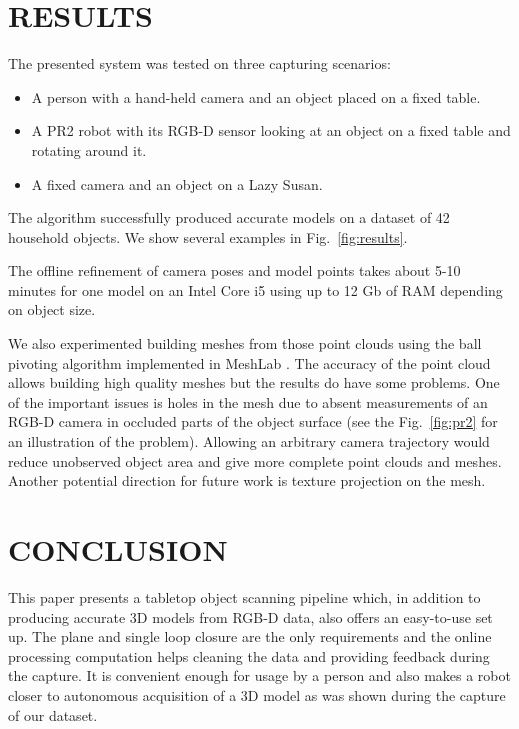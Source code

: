 \documentclass[letterpaper, 10 pt, conference]{ieeeconf}  %
\begin{document}
\section{RESULTS}

\label{sec:experiments}

The presented system was tested on three capturing scenarios:

\begin{itemize}
 \item A person with a hand-held camera and an object placed on a fixed table.
 \item A PR2 robot with its RGB-D sensor looking at an object on a fixed table and rotating around it.
 \item A fixed camera and an object on a Lazy Susan.
\end{itemize}

The algorithm successfully produced accurate models 
on a dataset of 42 household objects. We show several examples in Fig.~\ref{fig:results}.

The offline refinement of camera poses 
and model points takes about 5-10 minutes for one model on an Intel Core i5 using up to 12 Gb of RAM
depending on object size.

We also experimented building meshes from those point clouds using 
the ball pivoting algorithm \cite{bernardini1999ball}
implemented in MeshLab \cite{meshlab}. The accuracy of 
the point cloud allows building high quality meshes but the results do have some problems. One of the important issues 
is holes in 
the mesh due to absent measurements of an RGB-D camera in occluded parts of the object surface 
(see the Fig.~\ref{fig:pr2} for an illustration of the problem).
Allowing an arbitrary camera 
trajectory would reduce unobserved object area and give more complete
point clouds and meshes. Another potential direction for future work is texture projection on the mesh.


\section{CONCLUSION}

This paper presents a tabletop object scanning pipeline which, in addition to producing accurate 3D models from RGB-D 
data, also offers an easy-to-use set up. The plane and single loop closure are the only requirements and the online 
processing computation helps cleaning the data and providing feedback during the capture.
It is convenient enough for usage by a person and also makes a robot closer
to autonomous acquisition of a 3D model as was shown during the capture of our dataset.
\end{document}
